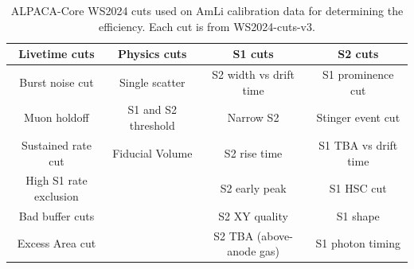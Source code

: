 \begin{table}
	\centering
	\begin{tabular}{c|c|c|c}
		Livetime cuts          & Physics cuts        & S1 cuts                  & S2 cuts              \\
		\hline
		Burst noise cut        & Single scatter      & S2 width vs drift time   & S1 prominence cut    \\
		Muon holdoff           & S1 and S2 threshold & Narrow S2                & Stinger event cut    \\
		Sustained rate cut     & Fiducial Volume     & S2 rise time             & S1 TBA vs drift time \\
		High S1 rate exclusion &                     & S2 early peak            & S1 HSC cut           \\
		Bad buffer cuts        &                     & S2 XY quality            & S1 shape             \\
		Excess Area cut        &                     & S2 TBA (above-anode gas) & S1 photon timing     \\
	\end{tabular}
	\caption{ALPACA-Core WS2024 cuts used on AmLi calibration data for determining the efficiency.
		Each cut is from WS2024-cuts-v3.
	}
	\label{tab:amli_efficiency_cuts}
\end{table}


